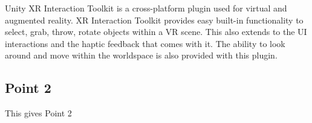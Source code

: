 Unity XR Interaction Toolkit is a cross-platform plugin used for virtual and augmented reality. XR Interaction Toolkit provides easy built-in functionality to select, grab, throw, rotate objects within a VR scene. This also extends to the UI interactions and the haptic feedback that comes with it. The ability to look around and move within the worldspace is also provided with this plugin.

\subsection{Point 2}
This gives Point 2
